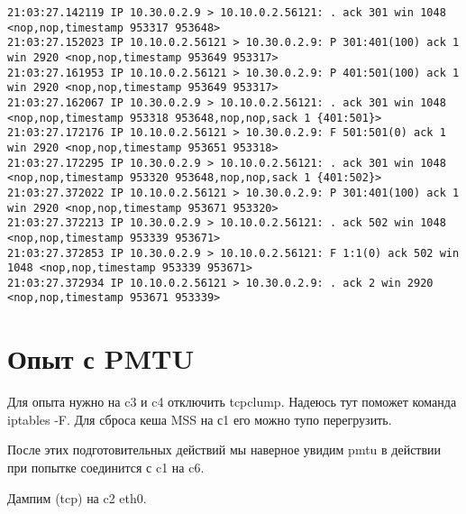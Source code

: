 \documentclass[a4paper,12pt]{article}
\begin{document}
\begin{lstlisting}
21:03:27.142119 IP 10.30.0.2.9 > 10.10.0.2.56121: . ack 301 win 1048 <nop,nop,timestamp 953317 953648>
21:03:27.152023 IP 10.10.0.2.56121 > 10.30.0.2.9: P 301:401(100) ack 1 win 2920 <nop,nop,timestamp 953649 953317>
21:03:27.161953 IP 10.10.0.2.56121 > 10.30.0.2.9: P 401:501(100) ack 1 win 2920 <nop,nop,timestamp 953649 953317>
21:03:27.162067 IP 10.30.0.2.9 > 10.10.0.2.56121: . ack 301 win 1048 <nop,nop,timestamp 953318 953648,nop,nop,sack 1 {401:501}>
21:03:27.172176 IP 10.10.0.2.56121 > 10.30.0.2.9: F 501:501(0) ack 1 win 2920 <nop,nop,timestamp 953651 953318>
21:03:27.172295 IP 10.30.0.2.9 > 10.10.0.2.56121: . ack 301 win 1048 <nop,nop,timestamp 953320 953648,nop,nop,sack 1 {401:502}>
21:03:27.372022 IP 10.10.0.2.56121 > 10.30.0.2.9: P 301:401(100) ack 1 win 2920 <nop,nop,timestamp 953671 953320>
21:03:27.372213 IP 10.30.0.2.9 > 10.10.0.2.56121: . ack 502 win 1048 <nop,nop,timestamp 953339 953671>
21:03:27.372853 IP 10.30.0.2.9 > 10.10.0.2.56121: F 1:1(0) ack 502 win 1048 <nop,nop,timestamp 953339 953671>
21:03:27.372934 IP 10.10.0.2.56121 > 10.30.0.2.9: . ack 2 win 2920 <nop,nop,timestamp 953671 953339>
\end{lstlisting}

\section{Опыт с PMTU}

Для опыта нужно на c3 и c4 отключить tcpclump.
Надеюсь тут поможет команда iptables -F.
Для сброса кеша MSS на с1 его можно тупо перегрузить.

После этих подготовительных действий мы наверное увидим pmtu в действии при попытке соединится с c1 на c6.

Дампим (tcp) на c2 eth0.
\end{document}
